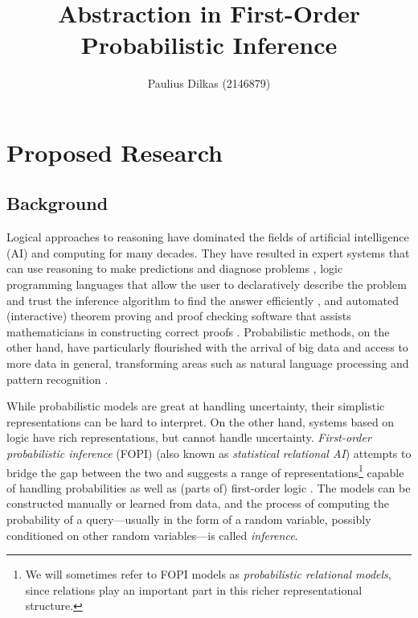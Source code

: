 \documentclass[11pt,english,twocolumn]{article}
\begin{document}
\title{Abstraction in First-Order Probabilistic Inference}

\author{Paulius Dilkas (2146879)}
\date{}
\maketitle

\section{Proposed Research}

\subsection*{Background} %

Logical approaches to reasoning have dominated the fields of artificial
intelligence (AI) and computing for many decades. They have resulted in expert
systems that can use reasoning to make predictions and diagnose problems
\cite{hayes1983building}, logic programming languages that allow the user to
declaratively describe the problem and trust the inference algorithm to find the
answer efficiently \cite{DBLP:books/sp/Lloyd87}, and automated (interactive)
theorem proving and proof checking software that assists mathematicians in
constructing correct proofs \cite{DBLP:books/el/RobinsonV01}. Probabilistic
methods, on the other hand, have particularly flourished with the arrival of big
data and access to more data in general, transforming areas such as natural
language processing and pattern recognition \cite{DBLP:series/sci/BrazAR08}.

While probabilistic models are great at handling uncertainty, their
simplistic representations can be hard to interpret. On the other hand, systems
based on logic have rich representations, but cannot handle uncertainty.
\emph{First-order probabilistic inference} (FOPI) (also known as
\emph{statistical relational AI}) attempts to bridge the gap
between the two and suggests a range of representations\footnote{ We will
  sometimes refer to FOPI models as \emph{probabilistic relational models},
  since relations play an important part in this richer representational
  structure.} capable of handling probabilities as well as (parts of)
first-order logic \cite{DBLP:series/sci/BrazAR08}. The models can be constructed
manually or learned from data, and the process of computing the probability of a
query---usually in the form of a random variable, possibly conditioned on other
random variables---is called \emph{inference}.
\end{document}
